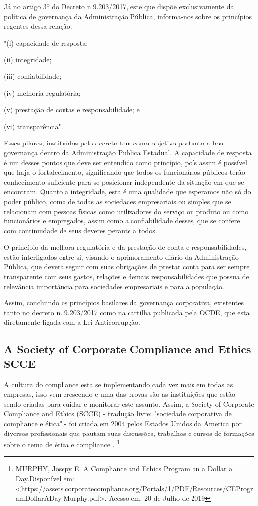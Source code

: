 Já no artigo 3º do Decreto n.9.203/2017, este que dispõe exclusivamente da política de governança da Administração Públíca, informa-nos sobre os princípios regentes dessa relação: 

"(i) capacidade de resposta;

(ii) integridade;

(iii) confiabilidade;

(iv) melhoria regulatória;

(v) prestação de contas e responsabilidade; e

(vi) transparência".

Esses pilares, instituídos pelo decreto tem como objetivo portanto a boa governança dentro da Administração Publica Estadual. A capacidade de resposta é um desses pontos que deve ser entendido como princípio, poís assim é possível que haja o fortalecimento, significando que todos os funcionários públicos terão conhecimento suficiente para se posicionar independente da situação em que se encontram. Quanto a integridade, esta é uma qualidade que esperamos não só do poder público, como de todas as sociedades empresariais ou simples que se relacionam com pessoas físicas como utilizadores do serviço ou produto ou como funcionários e empregados, assim como a confiabilidade desses, que se confere com continuidade de seus deveres perante a todos. 

O princípio da melhora regulatória e da prestação de conta e responsabilidades, estão interligados entre si, visando o aprimoramento diário da Administração Pública, que devera seguir com suas obrigações de prestar conta para ser sempre transparente com seus gastos, relações e demais responsabilidades que possua de relevância importância para sociedades empresariais e para a população. 

Assim, concluindo os princípios basilares da governança corporativa, existentes tanto no decreto n. 9.203/2017 como na cartilha publicada pela OCDE, que esta diretamente ligada com a Lei Anticorrupção. 

\subsection{A Society of Corporate Compliance and Ethics SCCE}

A cultura do compliance esta se implementando cada vez mais em todas as empresas, isso vem crescendo e uma das provas são as instituições que estão sendo criadas para cuidar e monitorar este assunto. Assim, a Society of Corporate Compliance and Ethics (SCCE) - tradução livre: "sociedade corporativa de compliance e ética" - foi criada em 2004 pelos Estados Unidos da America por diversos profissionais que pautam suas discussões, trabalhos e cursos de formações sobre o tema de ética e compliance \cite{ComplianceEthicsProgram}. \footnote{MURPHY, Josepy E. A Compliance and Ethics Program on a Dollar a Day.Disponível em: <https://assets.corporatecompliance.org/Portals/1/PDF/Resources/CEProgramDollarADay-Murphy.pdf>. Acesso em: 20 de Julho de 2019}

